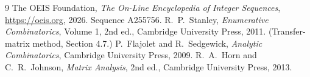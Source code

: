 \documentclass[11pt,a4paper]{article}
\theoremstyle{plain}
\theoremstyle{definition}
\begin{document}
\begin{thebibliography}{9}
 The OEIS Foundation, \emph{The On-Line Encyclopedia of Integer
Sequences}, \url{https://oeis.org}, 2026. Sequence A255756.
 R.~P.~Stanley, \emph{Enumerative Combinatorics}, Volume 1, 2nd ed.,
Cambridge University Press, 2011. (Transfer-matrix method, Section 4.7.)
 P.~Flajolet and R.~Sedgewick, \emph{Analytic Combinatorics}, Cambridge
University Press, 2009.
 R.~A.~Horn and C.~R.~Johnson, \emph{Matrix Analysis}, 2nd ed., Cambridge
University Press, 2013.
\end{thebibliography}
\end{document}
